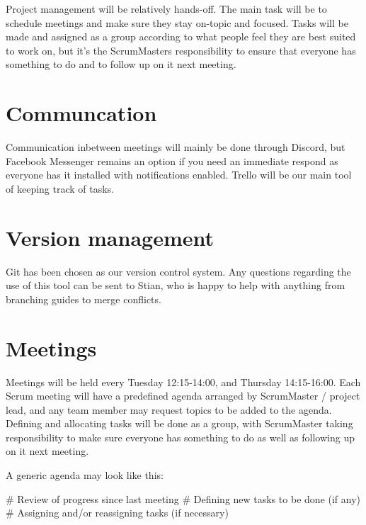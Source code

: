 \documentclass{article}
\begin{document}
Project management will be relatively hands-off. The main task will be to schedule meetings and make sure they stay on-topic and focused. Tasks will be made and assigned as a group according to what people feel they are best suited to work on, but it's the ScrumMasters responsibility to ensure that everyone has something to do and to follow up on it next meeting.

\section*{Communcation}

Communication inbetween meetings will mainly be done through Discord, but Facebook Messenger remains an option if you need an immediate respond as everyone has it installed with notifications enabled. Trello will be our main tool of keeping track of tasks.

\section*{Version management}

Git has been chosen as our version control system. Any questions regarding the use of this tool can be sent to Stian, who is happy to help with anything from branching guides to merge conflicts.

\section*{Meetings}

Meetings will be held every Tuesday 12:15-14:00, and Thursday 14:15-16:00. Each Scrum meeting will have a predefined agenda arranged by ScrumMaster / project lead, and any team member may request topics to be added to the agenda. Defining and allocating tasks will be done as a group, with ScrumMaster taking responsibility to make sure everyone has something to do as well as following up on it next meeting.

A generic agenda may look like this:

\begin{easylist}
    # Review of progress since last meeting
    # Defining new tasks to be done (if any)
    # Assigning and/or reassigning tasks (if necessary)
\end{easylist}
\end{document}
